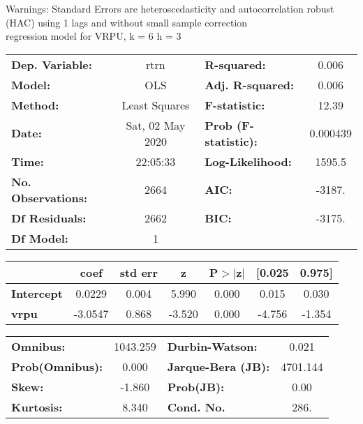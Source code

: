 Warnings: \newline
 [1] Standard Errors are heteroscedasticity and autocorrelation robust (HAC) using 1 lags and without small sample correction\\ 

regression model for VRPU, k = 6 h = 3\begin{center}
\begin{tabular}{lclc}
\toprule
\textbf{Dep. Variable:}    &       rtrn       & \textbf{  R-squared:         } &     0.006   \\
\textbf{Model:}            &       OLS        & \textbf{  Adj. R-squared:    } &     0.006   \\
\textbf{Method:}           &  Least Squares   & \textbf{  F-statistic:       } &     12.39   \\
\textbf{Date:}             & Sat, 02 May 2020 & \textbf{  Prob (F-statistic):} &  0.000439   \\
\textbf{Time:}             &     22:05:33     & \textbf{  Log-Likelihood:    } &    1595.5   \\
\textbf{No. Observations:} &        2664      & \textbf{  AIC:               } &    -3187.   \\
\textbf{Df Residuals:}     &        2662      & \textbf{  BIC:               } &    -3175.   \\
\textbf{Df Model:}         &           1      & \textbf{                     } &             \\
\bottomrule
\end{tabular}
\begin{tabular}{lcccccc}
                   & \textbf{coef} & \textbf{std err} & \textbf{z} & \textbf{P$> |$z$|$} & \textbf{[0.025} & \textbf{0.975]}  \\
\midrule
\textbf{Intercept} &       0.0229  &        0.004     &     5.990  &         0.000        &        0.015    &        0.030     \\
\textbf{vrpu}      &      -3.0547  &        0.868     &    -3.520  &         0.000        &       -4.756    &       -1.354     \\
\bottomrule
\end{tabular}
\begin{tabular}{lclc}
\textbf{Omnibus:}       & 1043.259 & \textbf{  Durbin-Watson:     } &    0.021  \\
\textbf{Prob(Omnibus):} &   0.000  & \textbf{  Jarque-Bera (JB):  } & 4701.144  \\
\textbf{Skew:}          &  -1.860  & \textbf{  Prob(JB):          } &     0.00  \\
\textbf{Kurtosis:}      &   8.340  & \textbf{  Cond. No.          } &     286.  \\
\bottomrule
\end{tabular}
\end{center}

